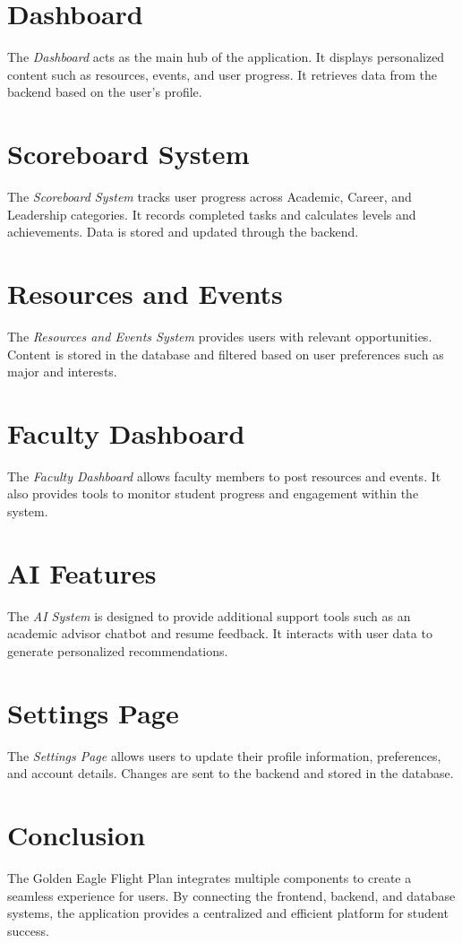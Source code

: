 \documentclass{article}
\begin{document}
\section{Dashboard}
The \textit{Dashboard} acts as the main hub of the application. It displays personalized content such as resources, events, and user progress. It retrieves data from the backend based on the user’s profile.

\section{Scoreboard System}
The \textit{Scoreboard System} tracks user progress across Academic, Career, and Leadership categories. It records completed tasks and calculates levels and achievements. Data is stored and updated through the backend.

\section{Resources and Events}
The \textit{Resources and Events System} provides users with relevant opportunities. Content is stored in the database and filtered based on user preferences such as major and interests.

\section{Faculty Dashboard}
The \textit{Faculty Dashboard} allows faculty members to post resources and events. It also provides tools to monitor student progress and engagement within the system.

\section{AI Features}
The \textit{AI System} is designed to provide additional support tools such as an academic advisor chatbot and resume feedback. It interacts with user data to generate personalized recommendations.

\section{Settings Page}
The \textit{Settings Page} allows users to update their profile information, preferences, and account details. Changes are sent to the backend and stored in the database.

\section{Conclusion}
The Golden Eagle Flight Plan integrates multiple components to create a seamless experience for users. By connecting the frontend, backend, and database systems, the application provides a centralized and efficient platform for student success.
\end{document}
